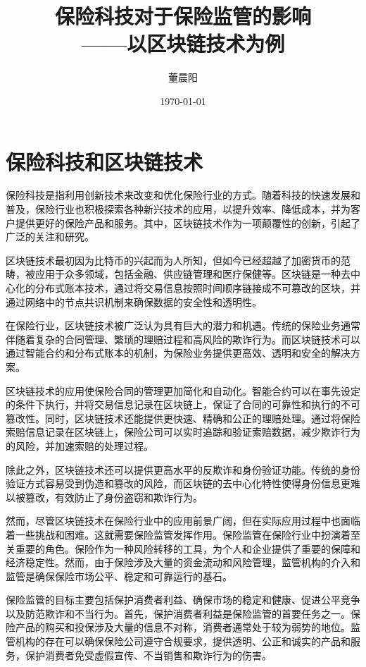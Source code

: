 \documentclass[a4paper,12pt]{ctexart}
\title{{保险科技对于保险监管的影响}\\\large{——以区块链技术为例}}
\author{董晨阳}
\date{\today}
\begin{document}
\maketitle
\tableofcontents
\clearpage
\section{保险科技和区块链技术}
保险科技是指利用创新技术来改变和优化保险行业的方式。随着科技的快速发展和普及，保险行业也积极探索各种新兴技术的应用，以提升效率、降低成本，并为客户提供更好的保险产品和服务。其中，区块链技术作为一项颠覆性的创新，引起了广泛的关注和研究。

区块链技术最初因为比特币的兴起而为人所知，但如今已经超越了加密货币的范畴，被应用于众多领域，包括金融、供应链管理和医疗保健等。区块链是一种去中心化的分布式账本技术，通过将交易信息按照时间顺序链接成不可篡改的区块，并通过网络中的节点共识机制来确保数据的安全性和透明性。

在保险行业，区块链技术被广泛认为具有巨大的潜力和机遇。传统的保险业务通常伴随着复杂的合同管理、繁琐的理赔过程和高风险的欺诈行为。而区块链技术可以通过智能合约和分布式账本的机制，为保险业务提供更高效、透明和安全的解决方案。

区块链技术的应用使保险合同的管理更加简化和自动化。智能合约可以在事先设定的条件下执行，并将交易信息记录在区块链上，保证了合同的可靠性和执行的不可篡改性。同时，区块链技术还能提供更快速、精确和公正的理赔处理。通过将保险索赔信息记录在区块链上，保险公司可以实时追踪和验证索赔数据，减少欺诈行为的风险，并加速索赔的处理过程。

除此之外，区块链技术还可以提供更高水平的反欺诈和身份验证功能。传统的身份验证方式容易受到伪造和篡改的风险，而区块链的去中心化特性使得身份信息更难以被篡改，有效防止了身份盗窃和欺诈行为。

然而，尽管区块链技术在保险行业中的应用前景广阔，但在实际应用过程中也面临着一些挑战和困难。这就需要保险监管发挥作用。保险监管在保险行业中扮演着至关重要的角色。保险作为一种风险转移的工具，为个人和企业提供了重要的保障和经济稳定性。然而，由于保险涉及大量的资金流动和风险管理，监管机构的介入和监管是确保保险市场公平、稳定和可靠运行的基石。

保险监管的目标主要包括保护消费者利益、确保市场的稳定和健康、促进公平竞争以及防范欺诈和不当行为。首先，保护消费者利益是保险监管的首要任务之一。保险产品的购买和投保涉及大量的信息不对称，消费者通常处于较为弱势的地位。监管机构的存在可以确保保险公司遵守合规要求，提供透明、公正和诚实的产品和服务，保护消费者免受虚假宣传、不当销售和欺诈行为的伤害。
\end{document}
